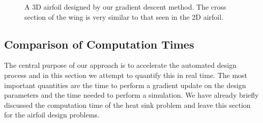 \documentclass{article} %
\begin{document}
\begin{figure}[h]
\begin{center}
\end{center}
\caption{A 3D airfoil designed by our gradient descent method. The cross section of the wing is very similar to that seen in the 2D airfoil.}
\end{figure}

\subsection{Comparison of Computation Times}

The central purpose of our approach is to accelerate the automated design process and in this section we attempt to quantify this in real time. The most important quantities are the time to perform a gradient update on the design parameters and the time needed to perform a simulation. We have already briefly discussed the computation time of the heat sink problem and leave this section for the airfoil design problems.
\end{document}
